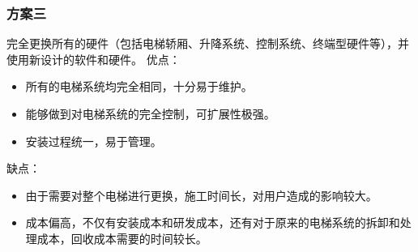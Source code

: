 \subsubsection{方案三}
完全更换所有的硬件（包括电梯轿厢、升降系统、控制系统、终端型硬件等），并使用新设计的软件和硬件。
优点：\par
\begin{itemize}
	\item 所有的电梯系统均完全相同，十分易于维护。
	\item 能够做到对电梯系统的完全控制，可扩展性极强。
	\item 安装过程统一，易于管理。
\end{itemize}
缺点：\par
\begin{itemize}
	\item 由于需要对整个电梯进行更换，施工时间长，对用户造成的影响较大。
	\item 成本偏高，不仅有安装成本和研发成本，还有对于原来的电梯系统的拆卸和处理成本，回收成本需要的时间较长。
\end{itemize}

